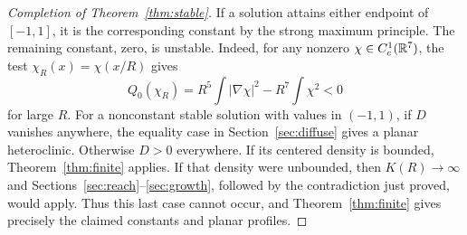 \begin{proof}[Completion of Theorem~\ref{thm:stable}]
If a solution attains either endpoint of $[-1,1]$, it is the corresponding
constant by the strong maximum principle. The remaining constant,
zero, is unstable. Indeed, for any nonzero $\chi\in C_c^1(\mathbb R^7)$,
the test $\chi_R(x)=\chi(x/R)$ gives
\[
 Q_0(\chi_R)=R^5\int|\nabla\chi|^2-R^7\int\chi^2<0
\]
for large $R$.
For a nonconstant stable solution with values in $(-1,1)$,
if $D$ vanishes anywhere, the equality case in
Section~\ref{sec:diffuse} gives a planar heteroclinic.
Otherwise $D>0$ everywhere. If its centered density is bounded,
Theorem~\ref{thm:finite} applies. If that density were unbounded,
then $K(R)\to\infty$ and Sections~\ref{sec:reach}--\ref{sec:growth},
followed by the contradiction just proved, would apply.
Thus this last case cannot occur, and Theorem~\ref{thm:finite}
gives precisely the claimed constants and planar profiles.
\end{proof}
